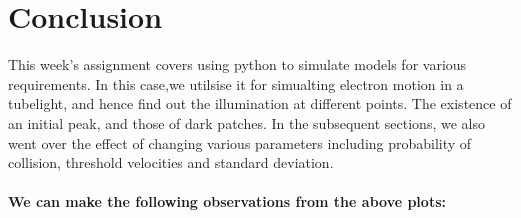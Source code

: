 \documentclass[11pt]{article}
\begin{document}
    \hypertarget{conclusion}{%
\section{Conclusion}\label{conclusion}}

This week's assignment covers using python to simulate models for
various requirements. In this case,we utilsise it for simualting
electron motion in a tubelight, and hence find out the illumination at
different points. The existence of an initial peak, and those of dark
patches. In the subsequent sections, we also went over the effect of
changing various parameters including probability of collision,
threshold velocities and standard deviation.

\hypertarget{we-can-make-the-following-observations-from-the-above-plots}{%
\paragraph{We can make the following observations from the above
plots:}\label{we-can-make-the-following-observations-from-the-above-plots}}
\end{document}
